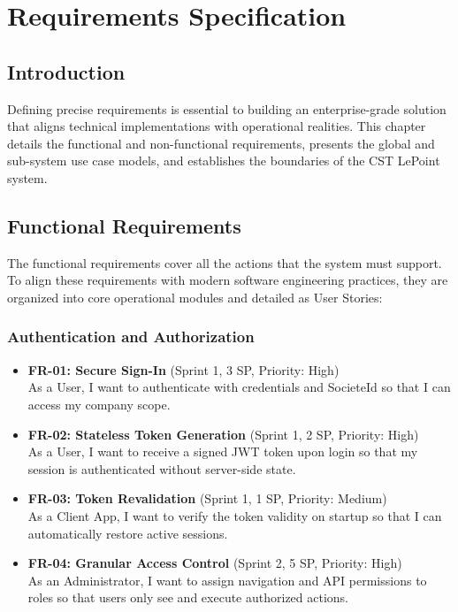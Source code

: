 \chapter{Requirements Specification}
\label{chap:requirements_specification}

\section{Introduction}

Defining precise requirements is essential to building an enterprise-grade solution that aligns technical implementations with operational realities. This chapter details the functional and non-functional requirements, presents the global and sub-system use case models, and establishes the boundaries of the CST LePoint system.

\section{Functional Requirements}

The functional requirements cover all the actions that the system must support. To align these requirements with modern software engineering practices, they are organized into core operational modules and detailed as User Stories:

\subsection{Authentication and Authorization}
\begin{itemize}
  \item \textbf{FR-01: Secure Sign-In} (Sprint 1, 3 SP, Priority: High) \\
  As a User, I want to authenticate with credentials and SocieteId so that I can access my company scope.
  \item \textbf{FR-02: Stateless Token Generation} (Sprint 1, 2 SP, Priority: High) \\
  As a User, I want to receive a signed JWT token upon login so that my session is authenticated without server-side state.
  \item \textbf{FR-03: Token Revalidation} (Sprint 1, 1 SP, Priority: Medium) \\
  As a Client App, I want to verify the token validity on startup so that I can automatically restore active sessions.
  \item \textbf{FR-04: Granular Access Control} (Sprint 2, 5 SP, Priority: High) \\
  As an Administrator, I want to assign navigation and API permissions to roles so that users only see and execute authorized actions.
\end{itemize}


